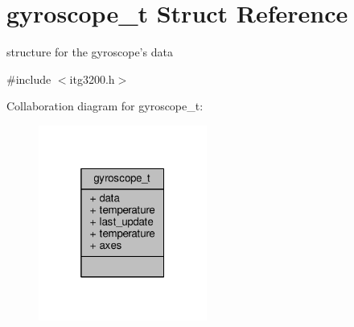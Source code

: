 \hypertarget{structgyroscope__t}{\section{gyroscope\+\_\+t Struct Reference}
\label{structgyroscope__t}
}


structure for the gyroscope's data  




{\ttfamily \#include $<$itg3200.\+h$>$}



Collaboration diagram for gyroscope\+\_\+t\+:
\nopagebreak
\begin{figure}[H]
\begin{center}
\leavevmode
\includegraphics[width=157pt]{structgyroscope__t__coll__graph}
\end{center}
\end{figure}

